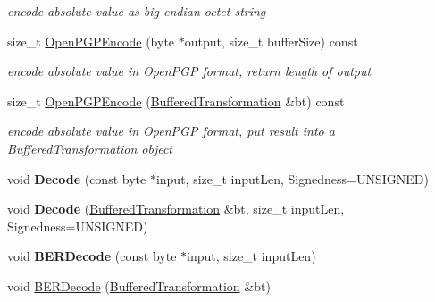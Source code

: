 \begin{DoxyCompactItemize}
\begin{DoxyCompactList}\small\item\em encode absolute value as big-\/endian octet string \item\end{DoxyCompactList}\item 
\hypertarget{class_integer_a9d6226e12e1ac0b957ad84ac54a15ce9}{
size\_\-t \hyperlink{class_integer_a9d6226e12e1ac0b957ad84ac54a15ce9}{OpenPGPEncode} (byte $\ast$output, size\_\-t bufferSize) const }
\label{class_integer_a9d6226e12e1ac0b957ad84ac54a15ce9}

\begin{DoxyCompactList}\small\item\em encode absolute value in OpenPGP format, return length of output \item\end{DoxyCompactList}\item 
\hypertarget{class_integer_a2325e09a01b29c3a70f3c2bcfcea0a1d}{
size\_\-t \hyperlink{class_integer_a2325e09a01b29c3a70f3c2bcfcea0a1d}{OpenPGPEncode} (\hyperlink{class_buffered_transformation}{BufferedTransformation} \&bt) const }
\label{class_integer_a2325e09a01b29c3a70f3c2bcfcea0a1d}

\begin{DoxyCompactList}\small\item\em encode absolute value in OpenPGP format, put result into a \hyperlink{class_buffered_transformation}{BufferedTransformation} object \item\end{DoxyCompactList}\item 
\hypertarget{class_integer_ae91fee9e9873f3412f47e6d647545099}{
void {\bfseries Decode} (const byte $\ast$input, size\_\-t inputLen, Signedness=UNSIGNED)}
\label{class_integer_ae91fee9e9873f3412f47e6d647545099}

\item 
\hypertarget{class_integer_a92052699599bfd434418b782dbaf4f72}{
void {\bfseries Decode} (\hyperlink{class_buffered_transformation}{BufferedTransformation} \&bt, size\_\-t inputLen, Signedness=UNSIGNED)}
\label{class_integer_a92052699599bfd434418b782dbaf4f72}

\item 
\hypertarget{class_integer_a810fc0382f8928893fe192ab79b1972c}{
void {\bfseries BERDecode} (const byte $\ast$input, size\_\-t inputLen)}
\label{class_integer_a810fc0382f8928893fe192ab79b1972c}

\item 
\hypertarget{class_integer_a8736cc41b06596c9c04328d2f0238db7}{
void \hyperlink{class_integer_a8736cc41b06596c9c04328d2f0238db7}{BERDecode} (\hyperlink{class_buffered_transformation}{BufferedTransformation} \&bt)}
\label{class_integer_a8736cc41b06596c9c04328d2f0238db7}


\end{DoxyCompactItemize}
